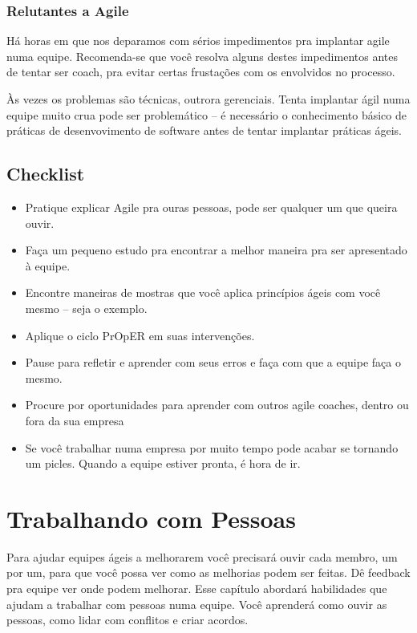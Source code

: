 \documentclass[a4paper, 10pt, font=plain]{abnt}
\begin{document}
\subsection{Relutantes a Agile}
Há horas em que nos deparamos com sérios impedimentos pra implantar agile numa equipe. Recomenda-se que você resolva alguns destes impedimentos antes de tentar ser coach, pra evitar certas frustações com os envolvidos no processo.

Às vezes os problemas são técnicas, outrora gerenciais. Tenta implantar ágil numa equipe muito crua pode ser problemático -- é necessário o conhecimento básico de práticas de desenvovimento de software antes de tentar implantar práticas ágeis.

\section{Checklist}
\begin{itemize}
\item Pratique explicar Agile pra ouras pessoas, pode ser qualquer um que queira ouvir.
\item Faça um pequeno estudo pra encontrar a melhor maneira pra ser apresentado à equipe.
\item Encontre maneiras de mostras que você aplica princípios ágeis com você mesmo -- seja o exemplo.
\item Aplique o ciclo PrOpER em suas intervenções.
\item Pause para refletir e aprender com seus erros e faça com que a equipe faça o mesmo.
\item Procure por oportunidades para aprender com outros agile coaches, dentro ou fora da sua empresa
\item Se você trabalhar numa empresa por muito tempo pode acabar se tornando um picles. Quando a equipe estiver pronta, é hora de ir.
\end{itemize}



\chapter{Trabalhando com Pessoas}
Para ajudar equipes ágeis a melhorarem você precisará ouvir cada membro, um por um, para que você possa ver como as melhorias podem ser feitas. Dê feedback pra equipe ver onde podem melhorar.
Esse capítulo abordará habilidades que ajudam a trabalhar com pessoas numa equipe. Você aprenderá como ouvir as pessoas, como lidar com conflitos e criar acordos.
\end{document}
